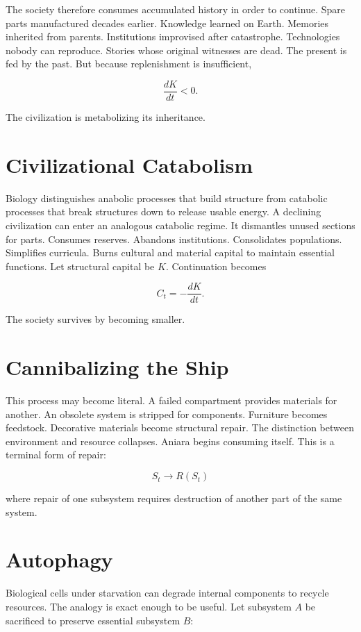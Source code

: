 \documentclass[11pt,oneside]{book}
\theoremstyle{definition}
\theoremstyle{remark}
\begin{document}
The society therefore consumes accumulated history in order to continue. Spare parts manufactured
decades earlier. Knowledge learned on Earth. Memories inherited from parents. Institutions
improvised after catastrophe. Technologies nobody can reproduce. Stories whose original witnesses
are dead. The present is fed by the past. But because replenishment is insufficient,

\[
\frac{dK}{dt}<0.
\]

The civilization is metabolizing its inheritance.

\section{Civilizational Catabolism}

Biology distinguishes anabolic processes that build structure from catabolic processes that break
structures down to release usable energy. A declining civilization can enter an analogous catabolic
regime. It dismantles unused sections for parts. Consumes reserves. Abandons institutions.
Consolidates populations. Simplifies curricula. Burns cultural and material capital to maintain
essential functions. Let structural capital be \(K\). Continuation becomes

\[
C_t = -\frac{dK}{dt}.
\]

The society survives by becoming smaller.

\section{Cannibalizing the Ship}

This process may become literal. A failed compartment provides materials for another. An obsolete
system is stripped for components. Furniture becomes feedstock. Decorative materials become
structural repair. The distinction between environment and resource collapses. Aniara begins
consuming itself. This is a terminal form of repair:

\[
S_t \rightarrow R(S_t)
\]

where repair of one subsystem requires destruction of another part of the same system.

\section{Autophagy}

Biological cells under starvation can degrade internal components to recycle resources. The analogy
is exact enough to be useful. Let subsystem \(A\) be sacrificed to preserve essential subsystem
\(B\):
\end{document}
